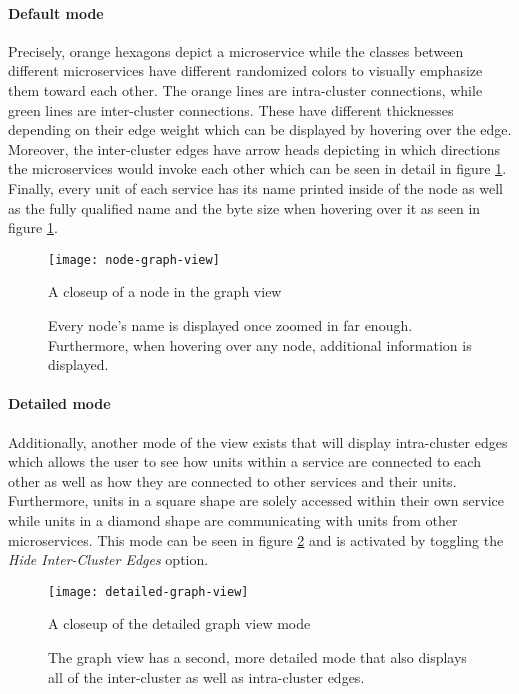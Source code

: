 \documentclass[12pt,a4paper]{report}
\begin{document}
\paragraph{Default mode}
Precisely, orange hexagons depict a microservice while the classes between
different microservices have different randomized colors to visually emphasize
them toward each other. The orange lines are intra-cluster connections,
while green lines are inter-cluster connections.
These have different thicknesses depending on their edge weight which can be
displayed by hovering over the edge. Moreover, the inter-cluster edges have
arrow heads depicting in which directions the microservices would invoke
each other which can be seen in detail in figure \ref{fig:node-graph-view}.
Finally, every unit of each service has its name printed inside of the node
as well as the fully qualified name and the byte size when hovering over it
as seen in figure \ref{fig:node-graph-view}.

\begin{figure}[htbp]
\centering
\texttt{[image: node-graph-view]}
\caption{A closeup of a node in the graph view}
\caption*{
  Every node's name is displayed once zoomed in far enough.
  Furthermore, when hovering over any node, additional information is displayed.
}
\label{fig:node-graph-view}
\end{figure}

\paragraph{Detailed mode}
Additionally, another mode of the view exists that will display intra-cluster
edges which allows the user to see how units within a service are connected
to each other as well as how they are connected to other services and their
units. Furthermore, units in a square shape are solely accessed within their
own service while units in a diamond shape are communicating with units from
other microservices.
This mode can be seen in figure \ref{fig:detailed-graph-view} and is
activated by toggling the \textit{Hide Inter-Cluster Edges} option.

\begin{figure}[htbp]
\centering
\texttt{[image: detailed-graph-view]}
\caption{A closeup of the detailed graph view mode}
\caption*{
  The graph view has a second, more detailed mode that also displays
  all of the inter-cluster as well as intra-cluster edges.
}
\label{fig:detailed-graph-view}
\end{figure}
\end{document}
